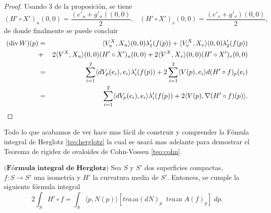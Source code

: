 \begin{proof}
	Usando 3 de la proposición, se tiene
	${ }$\\
	\[
		(H' \circ X')_u (0,0) = \frac{(e'_{u} + g'_{u})(0,0)}{2}, \;\;\; (H' \circ X')_v (0,0) = \frac{(e'_{v} + g'_{v})(0,0)}{2},
	\]
	${ }$\\
	de donde finalmente se puede concluir
	${ }$\\
	\begin{eqnarray*}
		(\hbox{div}\,W)(p)&=& \langle V^X_u,X_u\rangle(0,0) \lambda'_1(f(p))+\langle V^X_v,X_v\rangle(0,0) \lambda'_2(f(p))\\ &+& 2\langle V^X,X_u\rangle(0,0)(H'\circ X')_u(0,0)+2\langle V^X,X_v\rangle(0,0)(H'\circ X')_v(0,0)\\
		&=&\sum_{i=1}^2\langle dV_p(e_i),e_i\rangle\lambda'_i(f(p))+2\sum_{i=1}^2\langle V(p),e_i\rangle d(H'\circ f)_p(e_i)\\
		&=&\sum_{i=1}^2\langle dV_p(e_i),e_i\rangle\lambda'_i(f(p))+2\langle V(p),\nabla(H'\circ f)(p)\rangle.
	\end{eqnarray*}
\end{proof}
${ }$\\

Todo lo que acabamos de ver hace mas fácil de construir y comprender la Fómula integral de Herglotz \ref{teo:herglotz} la cual se usará mas adelante para demostrar el Teorema de rigidez de ovaloides de Cohn-Vossen \ref{teo:cohn}.
${ }$\\

\begin{teorema}\label{teo:herglotz}
	$\textbf{(Fórmula integral de Herglotz)}$ Sea $S$ y $S'$ dos superficies compactas, $f: S \to S'$ una isometría y $H'$ la curvatura media de $S'$. Entonces, se cumple la siguiente fórmula integral
	${ }$\\
	\[
		2 \int_S H' \circ f = \int_S \langle p, N(p) \rangle [traza(dN)_p \;\; traza \; A(f)_p] \; dp.
	\]
	
\end{teorema}


